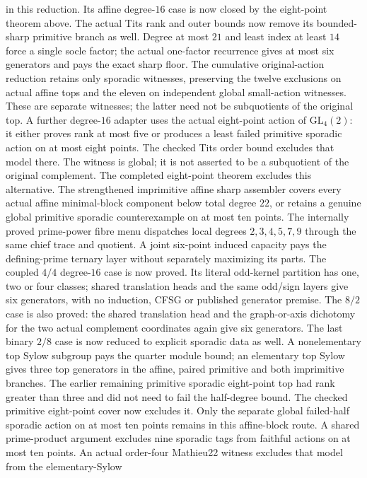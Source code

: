 in this reduction. Its affine degree-$16$ case is now closed by the
eight-point theorem above.
The actual Tits rank and outer bounds now remove its bounded-sharp
primitive branch as well. Degree at most $21$ and least index at least
$14$ force a single socle factor; the actual one-factor recurrence
gives at most six generators and pays the exact sharp floor. The
cumulative original-action reduction retains only sporadic witnesses,
preserving the twelve exclusions on actual affine tops and the eleven
on independent global small-action witnesses. These are separate
witnesses; the latter need not be subquotients of the original top.
A further degree-$16$ adapter uses the actual
eight-point action of $\mathrm{GL}_4(2)$: it either proves rank at most
five or produces a least failed primitive sporadic action on at most
eight points. The checked Tits order bound excludes that model there.
The witness is global; it is not asserted to be a subquotient of the
original complement. The completed eight-point theorem excludes this
alternative. The strengthened imprimitive affine sharp assembler covers
every actual affine minimal-block component below total degree $22$,
or retains a genuine global primitive sporadic counterexample on at
most ten points. The internally proved prime-power fibre menu dispatches
local degrees $2,3,4,5,7,9$ through the same chief trace and quotient.
A joint six-point induced capacity pays the defining-prime ternary layer
without separately maximizing its parts. The coupled $4/4$ degree-$16$ case is now proved. Its literal odd-kernel
partition has one, two or four classes; shared translation heads and
the same odd/sign layers give six generators, with no induction, CFSG
or published generator premise. The $8/2$ case is also proved: the
shared translation head and the graph-or-axis dichotomy for the two
actual complement coordinates again give six generators. The last
binary $2/8$ case is now reduced to explicit sporadic data as well.
A nonelementary top Sylow subgroup pays the quarter module bound;
an elementary top Sylow gives three top generators in the affine,
paired primitive and both imprimitive branches. The earlier remaining
primitive sporadic eight-point top had rank greater than three and
did not need to fail the half-degree bound. The checked primitive
eight-point cover now excludes it. Only the separate global failed-half
sporadic action on at most ten points remains in this affine-block route.
A shared prime-product argument excludes nine sporadic
tags from faithful actions on at most ten points. An actual order-four
Mathieu22 witness excludes that model from the elementary-Sylow
